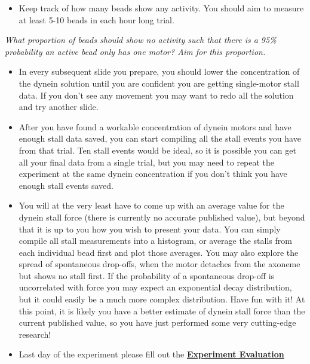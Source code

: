 \documentclass{../lab}
\begin{document}
\begin{itemize}
    \item Keep track of how many beads show any activity. You should aim to measure at least 5-10 beads in each hour long trial.

\end{itemize}

\emph{What proportion of beads should show no activity such that there is a 95\% probability an active bead only has one motor? Aim for this proportion.}

\begin{itemize}
    \item In every subsequent slide you prepare, you should lower the concentration of the dynein solution until you are confident you are getting single-motor stall data. If you don't see any movement you may want to redo all the solution and try another slide.

\end{itemize}

\begin{itemize}
    \item After you have found a workable concentration of dynein motors and have enough stall data saved, you can start compiling all the stall events you have from that trial. Ten stall events would be ideal, so it is possible you can get all your final data from a single trial, but you may need to repeat the experiment at the same dynein concentration if you don't think you have enough stall events saved.

\end{itemize}

\begin{itemize}
    \item You will at the very least have to come up with an average value for the dynein stall force (there is currently no accurate published value), but beyond that it is up to you how you wish to present your data. You can simply compile all stall measurements into a histogram, or average the stalls from each individual bead first and plot those averages. You may also explore the spread of spontaneous drop-offs, when the motor detaches from the axoneme but shows no stall first. If the probability of a spontaneous drop-off is uncorrelated with force you may expect an exponential decay distribution, but it could easily be a much more complex distribution. Have fun with it! At this point, it is likely you have a better estimate of dynein stall force than the current published value, so you have just performed some very cutting-edge research!

    \item Last day of the experiment please fill out the \href{\ExperimentEvaluation}{\textbf{Experiment Evaluation}}

\end{itemize}
\end{document}
